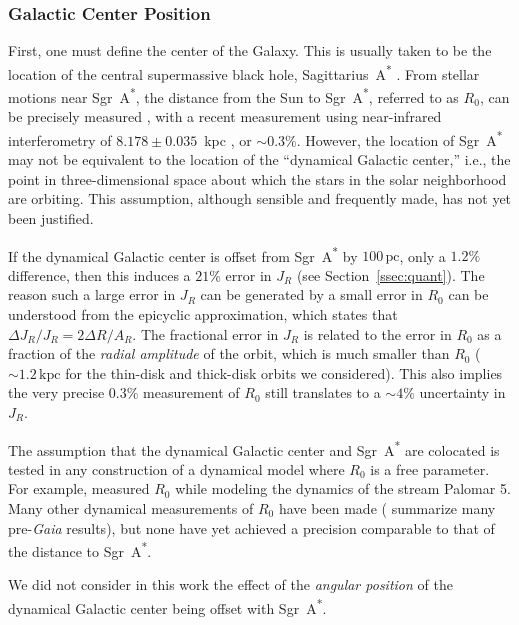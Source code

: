 \documentclass[twocolumn]{aastex62}
\newcommand{\pc}{\text{pc}}
\newcommand{\kpc}{\text{kpc}}
\newcommand{\sgra}{Sgr~A\textsuperscript{*}}
\begin{document}
\subsubsection{Galactic Center Position}
First, one must define the center of the Galaxy. This is usually taken to be
the location of the central supermassive black hole, Sagittarius~A\textsuperscript{*}
\citep[\sgra{}, e.g.][]{2004ApJ...616..872R}. From stellar motions near
\sgra{}, the distance from the Sun to \sgra{}, referred to as $R_0$, can be
precisely measured \citep{2009ApJ...692.1075G, 2018AA...615L..15G}, with a
recent measurement using near-infrared interferometry of $8.178 \pm 0.035$~kpc
\citep{2019arXiv190405721A}, or $\sim0.3\%$. However, the location of \sgra{} may not be equivalent to the location of the ``dynamical Galactic center,'' i.e., the
point in three-dimensional space about which the stars in the solar
neighborhood are orbiting. This assumption, although sensible and frequently
made, has not yet been justified.

If the dynamical Galactic center is offset from \sgra{} by $100\,\pc$, only a
$1.2\%$ difference, then this induces a $21\%$ error in $J_R$ (see
Section~\ref{ssec:quant}). The reason such a large error in $J_R$ can be
generated by a small error in $R_0$ can be understood from the epicyclic
approximation, which states that $\Delta J_R/J_R = 2\Delta R/A_R$. The
fractional error in $J_R$ is related to the error in $R_0$ as a fraction of
the {\em radial amplitude} of the orbit, which is much smaller than $R_0$
($\sim1.2\,\kpc$ for the thin-disk and thick-disk orbits we considered). This
also implies the very precise $0.3\%$ measurement of $R_0$ still translates to
a $\sim4\%$ uncertainty in $J_R$.

The assumption that the dynamical Galactic center and \sgra{} are colocated is
tested in any construction of a dynamical model where $R_0$ is a free
parameter. For example, \citet{2015ApJ...803...80K} measured $R_0$ while
modeling the dynamics of the stream Palomar 5. Many other dynamical
measurements of $R_0$ have been made (\citealt{2016ARAA..54..529B} summarize
many pre-\textit{Gaia} results), but none have yet achieved a precision
comparable to that of the distance to \sgra{}.

We did not consider in this work the effect of the \emph{angular position} of
the dynamical Galactic center being offset with \sgra{}.
\end{document}
